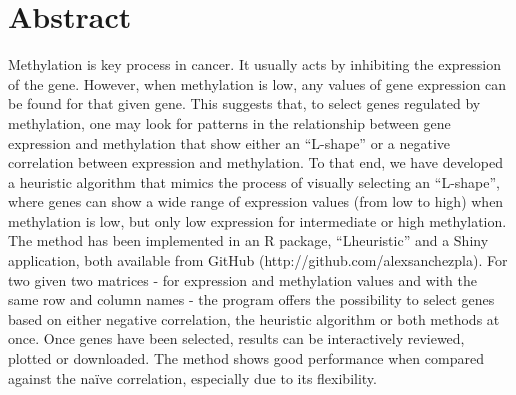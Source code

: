 \documentclass[10pt,letterpaper]{article}
\newcommand{\getIndex}[2]{
  \ForEach{,}{\IfEq{#1}{\thislevelitem}{\number\thislevelcount\ExitForEach}{}}{#2}
}
\newcommand{\getAff}[1]{
  \getIndex{#1}{Universitat de Barcelona (UB),Vall d'Hebron Research Institute (VHIR)}
}
\begin{document}
\vspace*{0.2in}

\section*{Abstract}
Methylation is key process in cancer. It usually acts by inhibiting the
expression of the gene. However, when methylation is low, any values of
gene expression can be found for that given gene. This suggests that, to
select genes regulated by methylation, one may look for patterns in the
relationship between gene expression and methylation that show either an
``L-shape'' or a negative correlation between expression and
methylation. To that end, we have developed a heuristic algorithm that
mimics the process of visually selecting an ``L-shape'', where genes can
show a wide range of expression values (from low to high) when
methylation is low, but only low expression for intermediate or high
methylation. The method has been implemented in an R package,
``Lheuristic'' and a Shiny application, both available from GitHub
(http://github.com/alexsanchezpla). For two given two matrices - for
expression and methylation values and with the same row and column names
- the program offers the possibility to select genes based on either
negative correlation, the heuristic algorithm or both methods at once.
Once genes have been selected, results can be interactively reviewed,
plotted or downloaded. The method shows good performance when compared
against the naïve correlation, especially due to its flexibility.
\end{document}
